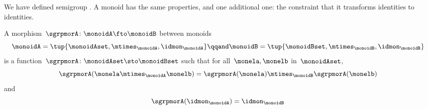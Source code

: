 We have defined semigroup \whomo. A monoid \whomo has the same properties, and one additional one: the constraint that it transforms identities to identities.

\begin{ctdefinition}
  \label{def:monoid-mor}
  A morphism~$\sgrpmorA\colon \monoidA \fto \monoidB$ between monoids
  \begin{equation}
    \monoidA = \tup{\monoidAset, \mtimes_\monoidA, \idmon_\monoidA}
    \qqand
    \monoidB = \tup{\monoidBset, \mtimes_\monoidB, \idmon_\monoidB}
  \end{equation}
  is a function~$\sgrpmorA \colon \monoidAset \sto \monoidBset$ such that
  for all~$\monela, \monelb$ in~$\monoidAset$,
  \begin{equation}
    \label{eq:mon-mor-comp}
    \sgrpmorA (\monela \mtimes_{\monoidA} \monelb) = \sgrpmorA (\monela) \mtimes_{\monoidB}  \sgrpmorA(\monelb)
  \end{equation}
  and
  \begin{equation}
    \label{eq:mon-id-comp}
    \sgrpmorA (\idmon_\monoidA) = \idmon_{\monoidB}
  \end{equation}
\end{ctdefinition}
